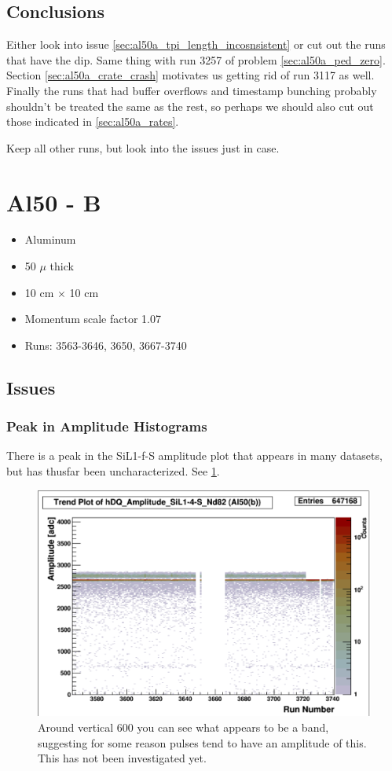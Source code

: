 \documentclass[a4paper]{article}
\begin{document}
\subsection{Conclusions}
Either look into issue \ref{sec:al50a_tpi_length_incosnsistent} or cut out the runs that have the dip. Same thing with run 3257 of
problem \ref{sec:al50a_ped_zero}. Section \ref{sec:al50a_crate_crash} motivates us getting rid of run 3117 as well. Finally
the runs that had buffer overflows and timestamp bunching probably shouldn't be treated the same as the rest, so perhaps
we should also cut out those indicated in \ref{sec:al50a_rates}.

Keep all other runs, but look into the issues just in case.



\section{Al50 - B}
\begin{itemize}
  \item Aluminum
  \item 50 $\mu$ thick
  \item 10 cm $\times$ 10 cm
  \item Momentum scale factor 1.07
  \item Runs:
    3563-3646, 3650, 3667-3740
\end{itemize}

\subsection{Issues}
\subsubsection{Peak in Amplitude Histograms}

There is a peak in the SiL1-f-S amplitude plot that appears in many datasets, but has
thusfar been uncharacterized. See \ref{fig:sil14s_amp}.

\begin{figure}
  \centering
  \includegraphics[width=0.9\linewidth]{figs/al50b/sil14s_amp}
  \caption{Around vertical 600 you can see what appears to be a band,
    suggesting for some reason pulses tend to have an amplitude of this.
    This has not been investigated yet.}
  \label{fig:sil14s_amp}
\end{figure}
\end{document}

